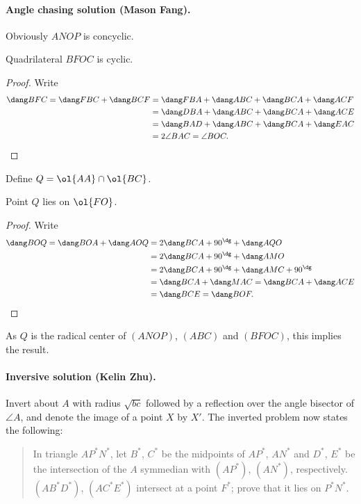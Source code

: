 \documentclass[11pt]{scrartcl}
\begin{document}
\paragraph{Angle chasing solution (Mason Fang).}
Obviously $ANOP$ is concyclic.
\begin{claim*}
  Quadrilateral $BFOC$ is cyclic.
\end{claim*}
\begin{proof}
  Write
  \begin{align*}
  \dang BFC = \dang FBC+\dang BCF
  &=\dang FBA +\dang ABC+\dang BCA+\dang ACF\\
  &=\dang DBA +\dang ABC+\dang BCA+\dang ACE\\
  &=\dang BAD +\dang ABC+\dang BCA+\dang EAC\\
  &=2\angle BAC=\angle BOC. \qedhere
  \end{align*}
\end{proof}
Define $Q = \ol{AA} \cap \ol{BC}$.
\begin{claim*}
  Point $Q$ lies on $\ol{FO}$.
\end{claim*}
\begin{proof}
  Write
  \begin{align*}
     \dang BOQ = \dang BOA+\dang AOQ
     &=2\dang BCA+90^{\dg}+\dang AQO\\
     &=2\dang BCA+90^{\dg}+\dang AMO\\
     &=2\dang BCA+90^{\dg}+\dang AMC+90^{\dg}\\
     &=\dang BCA+\dang MAC =\dang BCA+\dang ACE \\
     &=\dang BCE =\dang BOF. \qedhere
  \end{align*}
\end{proof}
As $Q$ is the radical center of $(ANOP)$, $(ABC)$ and $(BFOC)$,
this implies the result.
\paragraph{Inversive solution (Kelin Zhu).}
Invert about $A$ with radius $\sqrt{bc}$
followed by a reflection over the angle bisector of $\angle A$,
and denote the image of a point $X$ by $X'$.
The inverted problem now states the following:

\begin{quote}
  In triangle $AP^{\ast}N^{\ast}$,
  let $B^{\ast}$, $C^{\ast}$ be the midpoints of $AP^{\ast}$, $AN^{\ast}$
  and $D^{\ast}$, $E^{\ast}$ be the intersection of the $A$ symmedian
  with $(AP^{\ast})$, $(AN^{\ast})$, respectively.
  $(AB^{\ast}D^{\ast})$, $(AC^{\ast}E^{\ast})$
  intersect at a point $F^{\ast}$; prove that it lies on $P^{\ast}N^{\ast}$.
\end{quote}
\end{document}

